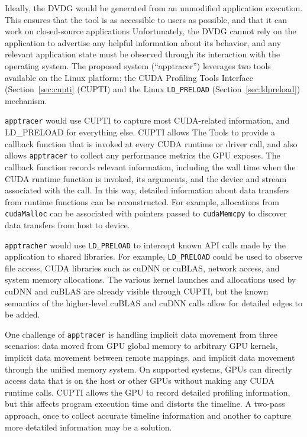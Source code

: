 Ideally, the DVDG would be generated from an unmodified application execution.
This ensures that the tool is as accessible to users as possible, and that it can work on closed-source applications
Unfortunately, the DVDG cannot rely on the application to advertise any helpful information about its behavior, and any relevant application state must be observed through its interaction with the operating system.
The proposed system (``apptracer'') leverages two tools available on the Linux platform: the CUDA Profiling Tools Interface (Section~\ref{sec:cupti} (CUPTI) and the Linux \texttt{LD\_PRELOAD} (Section~\ref{sec:ldpreload}) mechanism.

\texttt{apptracer} would use CUPTI to capture most CUDA-related information, and LD\_PRELOAD for everything else.
CUPTI allows The Tools to provide a callback function that is invoked at every CUDA runtime or driver call, and also allows \texttt{apptracer} to collect any performance metrics the GPU exposes.
The callback function records relevant information, including the wall time when the CUDA runtime function is invoked, its arguments, and the device and stream associated with the call.
In this way, detailed information about data transfers from runtime functions can be reconstructed.
For example, allocations from \texttt{cudaMalloc} can be associated with pointers passed to \texttt{cudaMemcpy} to discover data transfers from host to device.

\texttt{apptracher} would use \texttt{LD\_PRELOAD} to intercept known API calls made by the application to shared libraries.
For example, \texttt{LD\_PRELOAD} could be used to observe file access, CUDA libraries such as cuDNN or cuBLAS, network access, and system memory allocations.
The various kernel launches and allocations used by cuDNN and cuBLAS are already visible through CUPTI, but the known semantics of the higher-level cuBLAS and cuDNN calls allow for detailed edges to be added.

One challenge of \texttt{apptracer} is handling implicit data movement from three scenarios:
data moved from GPU global memory to arbitrary GPU kernels, implicit data movement between remote mappings, and implicit data movement through the unified memory system.
On supported systems, GPUs can directly access data that is on the host or other GPUs without making any CUDA runtime calls.
CUPTI allows the GPU to record detailed profiling information, but this affects program execution time and distorts the timeline.
A two-pass approach, once to collect accurate timeline information and another to capture more detatiled information may be a solution.

